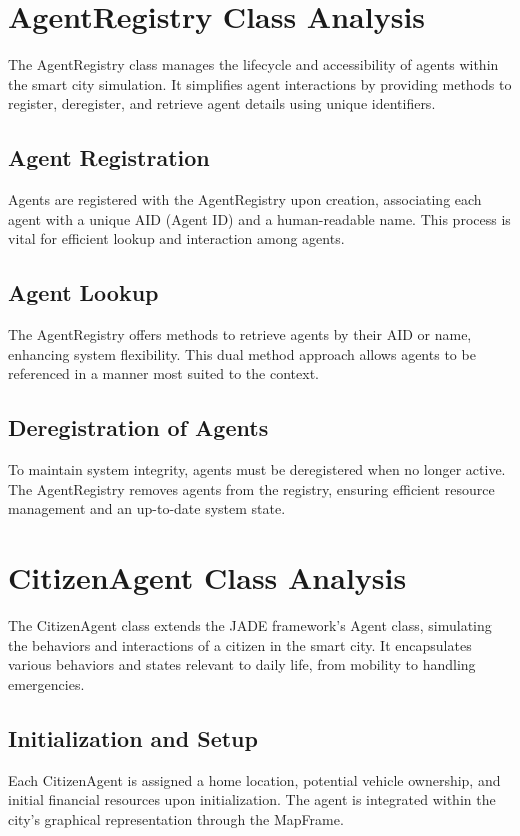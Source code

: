 \documentclass[conference]{IEEEtran}
\begin{document}
  
  \section{AgentRegistry Class Analysis}
  The AgentRegistry class manages the lifecycle and accessibility of agents within the smart city simulation. It simplifies agent interactions by providing methods to register, deregister, and retrieve agent details using unique identifiers.
  
  \subsection{Agent Registration}
  Agents are registered with the AgentRegistry upon creation, associating each agent with a unique AID (Agent ID) and a human-readable name. This process is vital for efficient lookup and interaction among agents.
  
  \subsection{Agent Lookup}
  The AgentRegistry offers methods to retrieve agents by their AID or name, enhancing system flexibility. This dual method approach allows agents to be referenced in a manner most suited to the context.
  
  \subsection{Deregistration of Agents}
  To maintain system integrity, agents must be deregistered when no longer active. The AgentRegistry removes agents from the registry, ensuring efficient resource management and an up-to-date system state.
  
  \section{CitizenAgent Class Analysis}
  The CitizenAgent class extends the JADE framework's Agent class, simulating the behaviors and interactions of a citizen in the smart city. It encapsulates various behaviors and states relevant to daily life, from mobility to handling emergencies.
  
  \subsection{Initialization and Setup}
  Each CitizenAgent is assigned a home location, potential vehicle ownership, and initial financial resources upon initialization. The agent is integrated within the city's graphical representation through the MapFrame.
  
\end{document}
